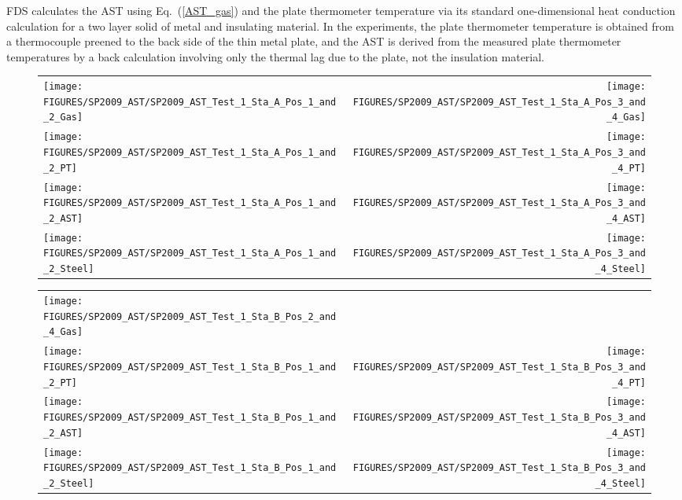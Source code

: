 FDS calculates the AST using Eq.~(\ref{AST_gas}) and the plate thermometer temperature via its standard one-dimensional heat conduction calculation for a 
two layer solid of metal and insulating material. In the experiments, the plate thermometer temperature is obtained from a thermocouple preened to the back side of
the thin metal plate, and the AST is derived from the measured plate thermometer temperatures by a back calculation involving only the thermal lag due to the
plate, not the insulation material.


\begin{figure}[p]
\begin{tabular*}{\textwidth}{l@{\extracolsep{\fill}}r}
\texttt{[image: FIGURES/SP2009\_AST/SP2009\_AST\_Test\_1\_Sta\_A\_Pos\_1\_and\_2\_Gas]} &
\texttt{[image: FIGURES/SP2009\_AST/SP2009\_AST\_Test\_1\_Sta\_A\_Pos\_3\_and\_4\_Gas]} \\
\texttt{[image: FIGURES/SP2009\_AST/SP2009\_AST\_Test\_1\_Sta\_A\_Pos\_1\_and\_2\_PT]} &
\texttt{[image: FIGURES/SP2009\_AST/SP2009\_AST\_Test\_1\_Sta\_A\_Pos\_3\_and\_4\_PT]} \\
\texttt{[image: FIGURES/SP2009\_AST/SP2009\_AST\_Test\_1\_Sta\_A\_Pos\_1\_and\_2\_AST]} &
\texttt{[image: FIGURES/SP2009\_AST/SP2009\_AST\_Test\_1\_Sta\_A\_Pos\_3\_and\_4\_AST]} \\
\texttt{[image: FIGURES/SP2009\_AST/SP2009\_AST\_Test\_1\_Sta\_A\_Pos\_1\_and\_2\_Steel]} &
\texttt{[image: FIGURES/SP2009\_AST/SP2009\_AST\_Test\_1\_Sta\_A\_Pos\_3\_and\_4\_Steel]}
\end{tabular*}
\label{SP_Test_1_Station_A}
\end{figure}

\begin{figure}[p]
\begin{tabular*}{\textwidth}{l@{\extracolsep{\fill}}r}
\texttt{[image: FIGURES/SP2009\_AST/SP2009\_AST\_Test\_1\_Sta\_B\_Pos\_2\_and\_4\_Gas]} &
  \\
\texttt{[image: FIGURES/SP2009\_AST/SP2009\_AST\_Test\_1\_Sta\_B\_Pos\_1\_and\_2\_PT]} &
\texttt{[image: FIGURES/SP2009\_AST/SP2009\_AST\_Test\_1\_Sta\_B\_Pos\_3\_and\_4\_PT]} \\
\texttt{[image: FIGURES/SP2009\_AST/SP2009\_AST\_Test\_1\_Sta\_B\_Pos\_1\_and\_2\_AST]} &
\texttt{[image: FIGURES/SP2009\_AST/SP2009\_AST\_Test\_1\_Sta\_B\_Pos\_3\_and\_4\_AST]} \\
\texttt{[image: FIGURES/SP2009\_AST/SP2009\_AST\_Test\_1\_Sta\_B\_Pos\_1\_and\_2\_Steel]} &
\texttt{[image: FIGURES/SP2009\_AST/SP2009\_AST\_Test\_1\_Sta\_B\_Pos\_3\_and\_4\_Steel]}
\end{tabular*}
\label{SP_Test_1_Station_B}
\end{figure}

